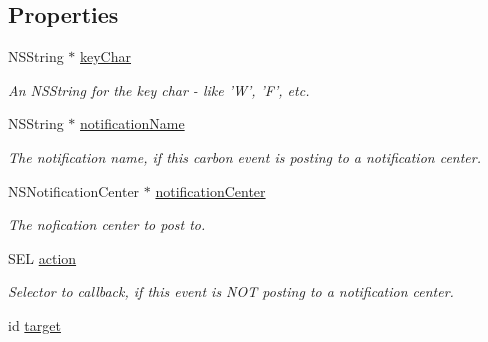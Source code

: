 \subsection*{Properties}
\begin{DoxyCompactItemize}
\item 
\hypertarget{interface_g_d_carbon_event_a6a1d5951550d087504bd446380ec90eb}{
NSString $\ast$ \hyperlink{interface_g_d_carbon_event_a6a1d5951550d087504bd446380ec90eb}{keyChar}}
\label{interface_g_d_carbon_event_a6a1d5951550d087504bd446380ec90eb}

\begin{DoxyCompactList}\small\item\em An NSString for the key char -\/ like 'W', 'F', etc. \item\end{DoxyCompactList}\item 
\hypertarget{interface_g_d_carbon_event_a5820e6b5f9552f7202f7d6608b93cda0}{
NSString $\ast$ \hyperlink{interface_g_d_carbon_event_a5820e6b5f9552f7202f7d6608b93cda0}{notificationName}}
\label{interface_g_d_carbon_event_a5820e6b5f9552f7202f7d6608b93cda0}

\begin{DoxyCompactList}\small\item\em The notification name, if this carbon event is posting to a notification center. \item\end{DoxyCompactList}\item 
\hypertarget{interface_g_d_carbon_event_aab9901af8082c9a5b68340bf6df42dc5}{
NSNotificationCenter $\ast$ \hyperlink{interface_g_d_carbon_event_aab9901af8082c9a5b68340bf6df42dc5}{notificationCenter}}
\label{interface_g_d_carbon_event_aab9901af8082c9a5b68340bf6df42dc5}

\begin{DoxyCompactList}\small\item\em The nofication center to post to. \item\end{DoxyCompactList}\item 
\hypertarget{interface_g_d_carbon_event_a1ab5a6cf85131499d75d62cee6b5be57}{
SEL \hyperlink{interface_g_d_carbon_event_a1ab5a6cf85131499d75d62cee6b5be57}{action}}
\label{interface_g_d_carbon_event_a1ab5a6cf85131499d75d62cee6b5be57}

\begin{DoxyCompactList}\small\item\em Selector to callback, if this event is NOT posting to a notification center. \item\end{DoxyCompactList}\item 
\hypertarget{interface_g_d_carbon_event_aedcfcd101bf6650ae61b6aa4ef8312a2}{
id \hyperlink{interface_g_d_carbon_event_aedcfcd101bf6650ae61b6aa4ef8312a2}{target}}
\label{interface_g_d_carbon_event_aedcfcd101bf6650ae61b6aa4ef8312a2}


\end{DoxyCompactItemize}
